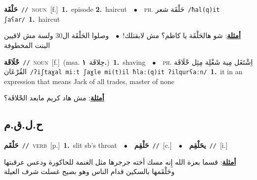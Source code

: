 \documentclass[10pt,a4paper,twoside]{article} %
\begin{document}
\begin{multicols}{2}
{\setlength\topsep{0pt}\textbf{\foreignlanguage{arabic}{حَلْقَة}}\ {\color{gray}\texttt{//}\color{black}}\ \textsc{noun}\ [f.]\ \textbf{1.}~episode  \textbf{2.}~haircut\ \ $\bullet$\ \ \textsc{ph.} \color{gray} \foreignlanguage{arabic}{حَلْقَة شعر}\color{black}\ {\color{gray}\texttt{/{\sffamily ħal(q)it ʃaʕar}/}\color{black}}\ \textbf{1.}~haircut\  \begin{flushright}\color{gray}\foreignlanguage{arabic}{\textbf{\underline{\foreignlanguage{arabic}{أمثلة}}}: شو هالحَلْقَة يا كاظم؟ مش لابقتلك!\ $\bullet$\ \  وصلوا الحَلْقَة ال30 ولسة مش لاقيين البنت المخطوفة}\end{flushright}\color{black}} \vspace{2mm}

{\setlength\topsep{0pt}\textbf{\foreignlanguage{arabic}{حْلَاقَة}}\ {\color{gray}\texttt{//}\color{black}}\ \textsc{noun}\ [f.]\ \color{gray}(msa. \foreignlanguage{arabic}{حِلاقَة}~\foreignlanguage{arabic}{\textbf{١.}})\color{black}\ \textbf{1.}~shaving\ \ $\bullet$\ \ \textsc{ph.} \color{gray} \foreignlanguage{arabic}{اِشْتَغَل مِية شَغْلِة مِثِل حْلَاقَة القُرْعَان}\color{black}\ {\color{gray}\texttt{/{\sffamily ʔiʃtaɣal miːt ʃaɣle mi(t)il ħlaː(q)it ʔilqurʕaːn}/}\color{black}}\ \textbf{1.}~it in an expression that means Jack of all trades, master of none\  \begin{flushright}\color{gray}\foreignlanguage{arabic}{\textbf{\underline{\foreignlanguage{arabic}{أمثلة}}}: مش هاد كريم مابعد الحْلاقَة؟}\end{flushright}\color{black}} \vspace{2mm}

\vspace{-3mm}
\subsection*{\color{blue}\foreignlanguage{arabic}{ح.ل.ق.م}\color{blue}{}} 

{\setlength\topsep{0pt}\textbf{\foreignlanguage{arabic}{حَلْقَم}}\ {\color{gray}\texttt{//}\color{black}}\ \textsc{verb}\ [p.]\ \textbf{1.}~slit sb's throat\ \ $\bullet$\ \ \setlength\topsep{0pt}\textbf{\foreignlanguage{arabic}{حَلْقِم}}\ {\color{gray}\texttt{//}\color{black}}\ [c.]\ \ $\bullet$\ \ \setlength\topsep{0pt}\textbf{\foreignlanguage{arabic}{يحَلْقِم}}\ {\color{gray}\texttt{//}\color{black}}\ [i.]\  \begin{flushright}\color{gray}\foreignlanguage{arabic}{\textbf{\underline{\foreignlanguage{arabic}{أمثلة}}}: قسما بعزة الله إِنه مسك أخته جرجرها مثل الغنمة للحاكورة ودعس عرقبتها وحَلْقَمها بالسكين قدام الناس وهو بصيح غسلت شرف العيلة}\end{flushright}\color{black}} \vspace{2mm}


\end{multicols}
\end{document}
